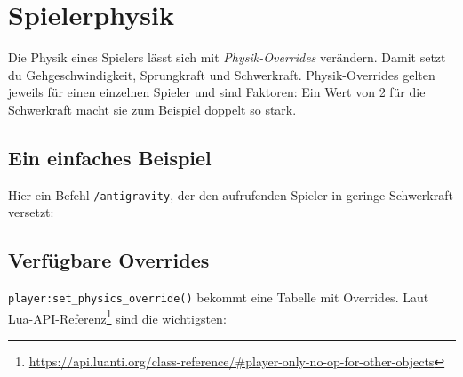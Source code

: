 \chapter{Spielerphysik}
\label{ch:players/player-physics}

Die Physik eines Spielers lässt sich mit \emph{Physik-Overrides}
verändern. Damit setzt du Gehgeschwindigkeit, Sprungkraft und
Schwerkraft. Physik-Overrides gelten jeweils für einen einzelnen Spieler
und sind Faktoren: Ein Wert von 2 für die Schwerkraft macht sie zum
Beispiel doppelt so stark.

\section{Ein einfaches Beispiel}\label{ein-einfaches-beispiel}

Hier ein Befehl \texttt{/\allowbreak{}antigravity}, der den aufrufenden
Spieler in geringe Schwerkraft versetzt:

\begin{Shaded}
\begin{Highlighting}[]
\OperatorTok{(}\OperatorTok{,} \OperatorTok{\{}
     \OperatorTok{=} \OperatorTok{(}\OperatorTok{,} \OperatorTok{)}
          \OperatorTok{=} \OperatorTok{(}\OperatorTok{)}
           
             \OperatorTok{,} 
        \OperatorTok{:}\OperatorTok{(\{}
             \OperatorTok{=} \OperatorTok{,} 
        \OperatorTok{\})}
    \OperatorTok{,}
\OperatorTok{\})}
\end{Highlighting}
\end{Shaded}

\section{Verfügbare Overrides}\label{verfuxfcgbare-overrides}

\texttt{player:set\_\allowbreak{}physics\_\allowbreak{}override()}
bekommt eine Tabelle mit Overrides. Laut Lua-API-Referenz\footnote{\url{https://api.luanti.org/class-reference/\#player-only-no-op-for-other-objects}}
sind die wichtigsten:

